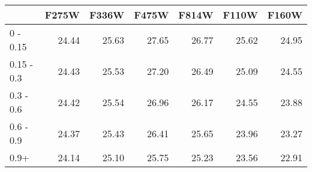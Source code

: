 \begin{tabular}{lrrrrrr}
\toprule
{} &  F275W &  F336W &  F475W &  F814W &  F110W &  F160W \\
\midrule
0 - 0.15   &  24.44 &  25.63 &  27.65 &  26.77 &  25.62 &  24.95 \\
0.15 - 0.3 &  24.43 &  25.53 &  27.20 &  26.49 &  25.09 &  24.55 \\
0.3 - 0.6  &  24.42 &  25.54 &  26.96 &  26.17 &  24.55 &  23.88 \\
0.6 - 0.9  &  24.37 &  25.43 &  26.41 &  25.65 &  23.96 &  23.27 \\
0.9+       &  24.14 &  25.10 &  25.75 &  25.23 &  23.56 &  22.91 \\
\bottomrule
\end{tabular}
